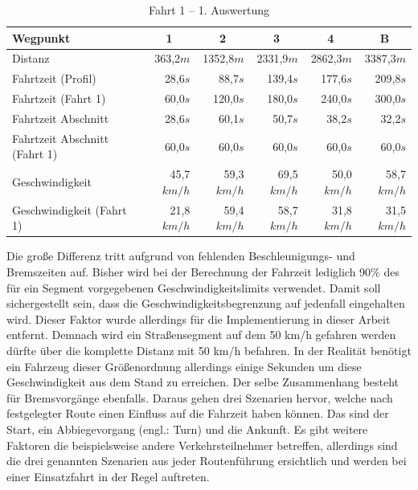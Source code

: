 \begin{table}[htb]
\centering
\small
\caption{Fahrt 1 -- 1. Auswertung}
\label{tab:driveinit}
\begin{tabular}{|l|r|r|r|r|r|}
\hline
Wegpunkt                               & \multicolumn{1}{c|}{1} & \multicolumn{1}{c|}{2} & \multicolumn{1}{c|}{3} & \multicolumn{1}{c|}{4} & \multicolumn{1}{c|}{B}      \\ \hline
Distanz                                & 363,2$m$                & 1352,8$m$               & 2331,9$m$               & 2862,3$m$               & 3387,3$m$               \\ \hline
Fahrtzeit (Profil)                     & 28,6$s$                 & 88,7$s$                 & 139,4$s$                & 177,6$s$                & 209,8$s$                \\ \hline
Fahrtzeit (Fahrt 1)                  & 60,0$s$                 & 120,0$s$                & 180,0$s$                & 240,0$s$                & 300,0$s$                \\ \hline
Fahrtzeit Abschnitt                    & 28,6$s$                 & 60,1$s$                 & 50,7$s$                 & 38,2$s$                 & 32,2$s$                 \\ \hline
Fahrtzeit Abschnitt (Fahrt 1)        & 60,0$s$                 & 60,0$s$                 & 60,0$s$                 & 60,0$s$                 & 60,0$s$                 \\ \hline
Geschwindigkeit                        & 45,7$km/h$              & 59,3$km/h$              & 69,5$km/h$              & 50,0$km/h$              & 58,7$km/h$              \\ \hline
Geschwindigkeit (Fahrt 1)            & 21,8$km/h$              & 59,4$km/h$              & 58,7$km/h$              & 31,8$km/h$              & 31,5$km/h$              \\ \hline
\end{tabular}
\end{table}

Die große Differenz tritt aufgrund von fehlenden Beschleunigungs- und Bremszeiten auf.
Bisher wird bei der Berechnung der Fahrzeit lediglich 90$\%$ des für ein Segment vorgegebenen Geschwindigkeitslimits verwendet.
Damit soll sichergestellt sein, dass die Geschwindigkeitsbegrenzung auf jedenfall eingehalten wird.
Dieser Faktor wurde allerdings für die Implementierung in dieser Arbeit entfernt.
Demnach wird ein Straßensegment auf dem 50 km/h gefahren werden dürfte über die komplette Distanz mit 50 km/h befahren.
In der Realität benötigt ein Fahrzeug dieser Größenordnung allerdings einige Sekunden um diese Geschwindigkeit aus dem Stand zu erreichen.
Der selbe Zusammenhang besteht für Bremsvorgänge ebenfalls.
Daraus gehen drei Szenarien hervor, welche nach festgelegter Route einen Einfluss auf die Fahrzeit haben können.
Das sind der Start, ein Abbiegevorgang (engl.: Turn) und die Ankunft.
Es gibt weitere Faktoren die beispielsweise andere Verkehrsteilnehmer betreffen, allerdings sind die drei genannten Szenarien aus jeder Routenführung ersichtlich und werden bei einer Einsatzfahrt in der Regel auftreten.

